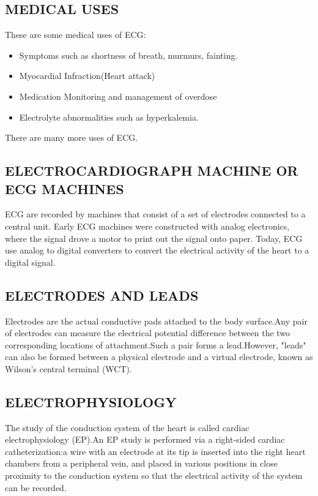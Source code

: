 \documentclass[12pt]{article}
\begin{document}
\subsection{MEDICAL USES}


{\large These are some medical uses of ECG:

\begin{itemize}
\item Symptoms such as shortness of breath, murmurs, fainting.
\item Myocardial Infraction(Heart attack)
\item Medication Monitoring and management of overdose
\item Electrolyte abnormalities such as hyperkalemia.
\end{itemize}
 There are many more uses of ECG.}


\subsection{ELECTROCARDIOGRAPH MACHINE OR ECG MACHINES}





{\large ECG are recorded by machines that consist of a set of electrodes connected to a central unit. Early ECG machines were constructed with analog electronics, where the signal drove a motor to print out the signal onto paper. Today, ECG use analog to digital converters to convert the electrical activity of the heart to a digital signal.}



\subsection{ELECTRODES AND LEADS}




{\large Electrodes are the actual conductive pads attached to the body surface.Any pair of electrodes can measure the electrical potential difference between the two corresponding locations of attachment.Such a pair forms a lead.However, "leads" can also be formed between a physical electrode and a virtual electrode, known as Wilson's central terminal (WCT).}


\subsection{ELECTROPHYSIOLOGY}

{\large The study of the conduction system of the heart is called cardiac electrophysiology (EP).An EP study is performed via a right-sided cardiac catheterization:a wire with an electrode at its tip is inserted into the right heart chambers from a peripheral vein, and placed in various positions in close proximity to the conduction system so that the electrical activity of the system can be recorded.}
\end{document}
